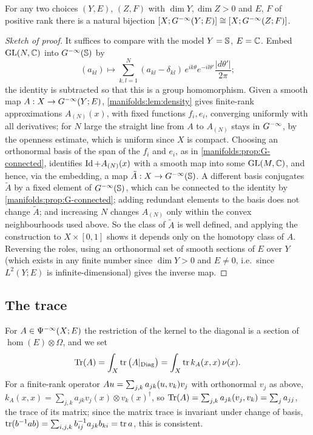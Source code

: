 \begin{proposition}\label{manifolds:prop:K1}
For any two choices $(Y,E)$, $(Z,F)$ with $\dim Y,\dim Z>0$ and $E$, $F$ of positive
rank there is a natural
bijection $[X;G^{-\infty}(Y;E)]\cong[X;G^{-\infty}(Z;F)]$.
\end{proposition}
\begin{proof}[Sketch of proof]
It suffices to compare with the model $Y=\mathbb{S}$, $E=\mathbb{C}$. Embed $\operatorname{GL}(N,\mathbb{C})$ into
$G^{-\infty}(\mathbb{S})$ by
\begin{equation*}
(a_{kl})\longmapsto\sum_{k,l=1}^N(a_{kl}-\delta_{kl})\,e^{ik\theta}e^{-il\theta'}\frac{|d\theta'|}{2\pi};
\end{equation*}
the identity is subtracted so that this is a group homomorphism. Given a smooth map
$A:X\to G^{-\infty}(Y;E)$, \cref{manifolds:lem:density} gives finite-rank approximations $A_{(N)}(x)$,
with fixed functions $f_i,e_i$, converging uniformly with all derivatives; for $N$ large
the straight line from $A$ to $A_{(N)}$ stays in $G^{-\infty}$, by the openness estimate,
which is uniform since $X$ is compact. Choosing an orthonormal basis of the span of
the $f_i$ and $e_i$, as in \cref{manifolds:prop:G-connected}, identifies $\operatorname{Id}+A_{(N)}(x)$ with a smooth
map into some $\operatorname{GL}(M,\mathbb{C})$, and hence, via the embedding, a map $\tilde A:X\to G^{-\infty}(\mathbb{S})$.
A different basis conjugates $\tilde A$ by a fixed element of $G^{-\infty}(\mathbb{S})$, which can
be connected to the identity by \cref{manifolds:prop:G-connected}; adding redundant elements
to the basis does not change $\tilde A$; and increasing $N$ changes $A_{(N)}$ only within
the convex neighbourhoods used above. So the class of $\tilde A$ is well defined, and
applying the construction to $X\times[0,1]$ shows it depends only on the homotopy class
of $A$. Reversing the roles, using an orthonormal set of smooth sections of $E$ over $Y$
(which exists in any finite number since $\dim Y>0$ and $E\ne0$, i.e.\ since $L^2(Y;E)$
is infinite-dimensional) gives the inverse map.
\end{proof}

\subsection{The trace}
For $A\in\Psi^{-\infty}(X;E)$ the restriction of the kernel to the diagonal is a
section of $\hom(E)\otimes\Omega$, and we set
\begin{equation}\label{manifolds:eq:trace}
\operatorname{Tr}(A)=\int_X\operatorname{tr}\big(A|_{\operatorname{Diag}}\big)=\int_X\operatorname{tr} k_A(x,x)\,\nu(x).
\end{equation}
For a finite-rank operator $Au=\sum_{j,k}a_{jk}( u, v_k)v_j$ with orthonormal $v_j$ as above,
$k_A(x,x)=\sum_{j,k}a_{jk}v_j(x)\otimes v_k(x)^\dagger$, so
$\operatorname{Tr}(A)=\sum_{j,k}a_{jk}( v_j, v_k)=\sum_ja_{jj}$, the trace of its matrix; since the
matrix trace is invariant under change of basis,
$\operatorname{tr}(b^{-1}ab)=\sum_{i,j,k}b^{-1}_{ij}a_{jk}b_{ki}=\operatorname{tr} a$, this is consistent.

